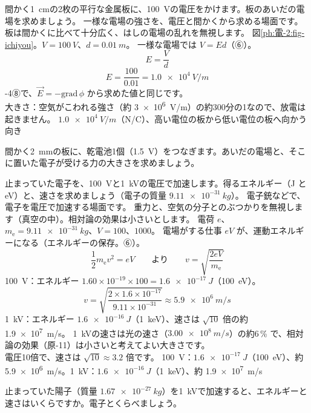 \label{ph:電-2:ex4}
\begin{phreidai}[平行な板のあいだの電場]
間かく\qty{1}{cm}の2枚の平行な金属板に、\qty{100}{V}の電圧をかけます。板のあいだの電場を求めましょう。
\phbamen
一様な電場の強さを、電圧と間かくから求める場面です。
\phmushi
板は間かくに比べて十分広く、はしの電場の乱れを無視します。
\phzu
図\ref{ph:電-2:fig-ichiyou}。$V=\qty{100}{V}$、$d=\qty{0.01}{m}$。
\phriyu
一様な電場では $V=Ed$（⑥）。
\phtateru
\[E=\frac{V}{d}\]
\phtoku
\[E=\frac{100}{0.01}=\qty{1.0e4}{V/m}\]
-4⑧で、$\vec E=-\mathrm{grad}\,\phi$ から求めた値と同じです。\\
大きさ：空気がこわれる強さ（約 \qty{3e6}{V/m}）の約300分の1なので、放電は起きません。
\kotae $\qty{1.0e4}{V/m}$（N/C）、高い電位の板から低い電位の板へ向かう向き
\end{phreidai}
\begin{jibun}
間かく\qty{2}{mm}の板に、乾電池1個（\qty{1.5}{V}）をつなぎます。あいだの電場と、そこに置いた電子が受ける力の大きさを求めましょう。
\end{jibun}

\label{ph:電-2:ex5}
\begin{phreidai}[電子を電圧で加速する]
止まっていた電子を、\qty{100}{V}と\qty{1}{kV}の電圧で加速します。得るエネルギー（J と eV）と、速さを求めましょう（電子の質量 $\qty{9.11e-31}{kg}$）。
\phbamen
電子銃などで、電子を電圧で加速する場面です。
\phmushi
重力と、空気の分子とのぶつかりを無視します（真空の中）。相対論の効果は小さいとします。
\phzu
電荷 $e$、$m_{\mathrm e}=\qty{9.11e-31}{kg}$、$V=100$、$1000$。
\phriyu
電場がする仕事 $eV$ が、運動エネルギーになる（エネルギーの保存。⑥）。
\phtateru
\[\frac12m_{\mathrm e}v^2=eV\qquad\text{より}\qquad v=\sqrt{\frac{2eV}{m_{\mathrm e}}}\]
\phtoku
\qty{100}{V}：エネルギー $1.60\times10^{-19}\times100=\qty{1.6e-17}{J}$（\qty{100}{eV}）。
\[v=\sqrt{\frac{2\times1.6\times10^{-17}}{9.11\times10^{-31}}}\approx\qty{5.9e6}{m/s}\]
\qty{1}{kV}：エネルギー $\qty{1.6e-16}{J}$（\qty{1}{keV}）、速さは $\sqrt{10}$ 倍の約 \qty{1.9e7}{m/s}。
\phtashikame
\qty{1}{kV}の速さは光の速さ（$\qty{3.00e8}{m/s}$）の約6\,\% で、相対論の効果（原-11）は小さいと考えてよい大きさです。\\
電圧10倍で、速さは $\sqrt{10}\approx3.2$ 倍です。
\kotae \qty{100}{V}：$\qty{1.6e-17}{J}$（\qty{100}{eV}）、約 \qty{5.9e6}{m/s}。\qty{1}{kV}：$\qty{1.6e-16}{J}$（\qty{1}{keV}）、約 \qty{1.9e7}{m/s}
\end{phreidai}
\begin{jibun}
止まっていた陽子（質量 $\qty{1.67e-27}{kg}$）を\qty{1}{kV}で加速すると、エネルギーと速さはいくらですか。電子とくらべましょう。
\end{jibun}

